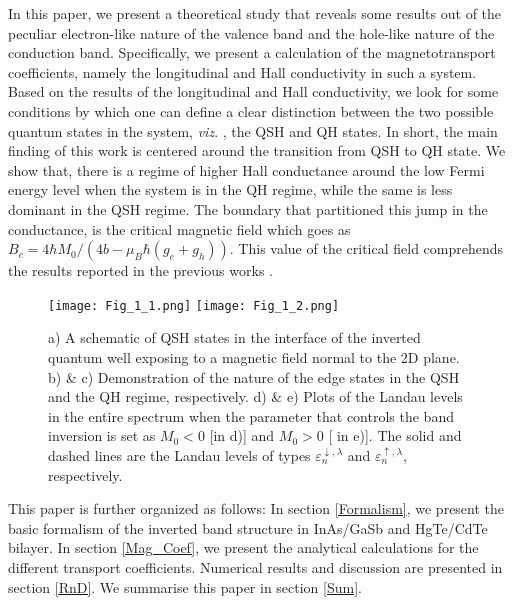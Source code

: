 \documentclass[prb,twocolumn]{revtex4-1}
\begin{document}
In this paper, we present a theoretical study that reveals some results out of the peculiar electron-like nature of the valence band and the hole-like nature of the conduction band. %
Specifically, we present a calculation of the magnetotransport coefficients, namely the longitudinal and Hall conductivity in such a system. Based on the results of the longitudinal and Hall conductivity, we look for some conditions by which one can define a clear distinction between the two possible quantum states in the system, \textit{viz}. , the QSH and QH states. In short, the main finding of this work is centered around the transition from QSH to QH state. We show that, there is a regime of higher Hall conductance around the low Fermi energy level when the system is in the QH regime, while the same is less dominant in the QSH regime. The boundary that partitioned this jump in the conductance, is the critical magnetic field which goes as $B_c=4\hbar M_0/(4b-\mu_B\hbar (g_e+g_h))$. This value of the critical field comprehends the results reported in the previous works \cite{critical1,Hamil2}.
\begin{figure}[t]
	\texttt{[image: Fig\_1\_1.png]}
	\texttt{[image: Fig\_1\_2.png]}
	\caption{a) A schematic of QSH states in the interface of the inverted quantum well exposing to a magnetic field normal to the 2D plane. b) \& c) Demonstration of the nature of the edge states in the QSH and the QH regime, respectively. d) \& e) Plots of the Landau levels in the entire spectrum when the parameter that controls the band inversion is set as $M_0<0$ [in d)] and $M_0>0$ [ in e)]. The solid and dashed lines are the Landau levels of types $\varepsilon_n^{\downarrow,\lambda}$ and $\varepsilon_n^{\uparrow,\lambda}$, respectively.}
	\label{Fig2}
\end{figure}

This paper is further organized as follows:  In section \ref{Formalism}, we
present the basic formalism of the inverted band structure in InAs/GaSb and HgTe/CdTe bilayer. In section \ref{Mag_Coef}, we present the analytical calculations for the different transport coefficients.
Numerical results and discussion are presented in section
\ref{RnD}. We summarise this paper in section \ref{Sum}.
\end{document}
